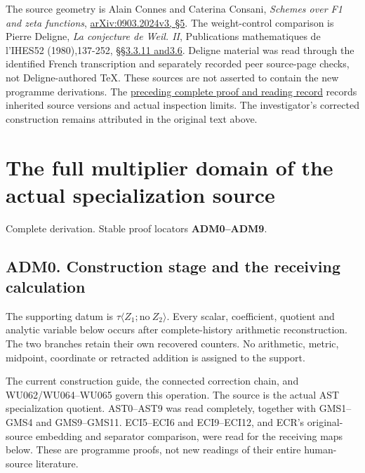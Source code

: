 The source geometry is Alain Connes and Caterina Consani, \emph{Schemes
over F1 and zeta functions},
\href{https://arxiv.org/abs/0903.2024v3}{arXiv:0903.2024v3, §5}. The
weight-control comparison is Pierre Deligne, \emph{La conjecture de
Weil. II}, Publications mathematiques de l'IHES52 (1980),137-252,
\href{https://www.numdam.org/item/PMIHES_1980__52__137_0/}{§§3.3.11
and3.6}. Deligne material was read through the identified French
transcription and separately recorded peer source-page checks, not
Deligne-authored TeX. These sources are not asserted to contain the new
programme derivations. The
\href{https://github.com/KokunoYumeto/zeta-function-research-reader/blob/36a82ecca98addb8a98b48204e349737856c7223/workbenches/splitzero-tandem/continuations/20260924-cohomology-weight-and-character-lifts/BUILD_AND_REVIEW.md}{preceding
complete proof and reading record} records inherited source versions and
actual inspection limits. The investigator's corrected construction
remains attributed in the original text above.

\chapter{The full multiplier domain of the actual specialization
source}\label{the-full-multiplier-domain-of-the-actual-specialization-source}

Complete derivation. Stable proof locators \textbf{ADM0--ADM9}.

\section{ADM0. Construction stage and the receiving
calculation}\label{adm0.-construction-stage-and-the-receiving-calculation}

The supporting datum is \(\tau\langle Z_1;\mathrm{no}\ Z_2\rangle\).
Every scalar, coefficient, quotient and analytic variable below occurs
after complete-history arithmetic reconstruction. The two branches
retain their own recovered counters. No arithmetic, metric, midpoint,
coordinate or retracted addition is assigned to the support.

The current construction guide, the connected correction chain, and
WU062/WU064--WU065 govern this operation. The source is the actual AST
specialization quotient. AST0--AST9 was read completely, together with
GMS1--GMS4 and GMS9--GMS11. ECI5--ECI6 and ECI9--ECI12, and ECR's
original-source embedding and separator comparison, were read for the
receiving maps below. These are programme proofs, not new readings of
their entire human-source literature.

